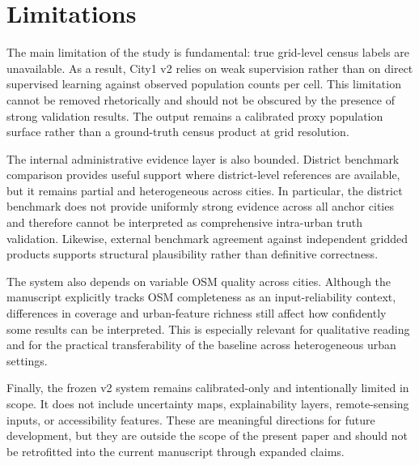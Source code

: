\section{Limitations}

The main limitation of the study is fundamental: true grid-level census labels are unavailable. As a result, City1 v2 relies on weak supervision rather than on direct supervised learning against observed population counts per cell. This limitation cannot be removed rhetorically and should not be obscured by the presence of strong validation results. The output remains a calibrated proxy population surface rather than a ground-truth census product at grid resolution.

The internal administrative evidence layer is also bounded. District benchmark comparison provides useful support where district-level references are available, but it remains partial and heterogeneous across cities. In particular, the district benchmark does not provide uniformly strong evidence across all anchor cities and therefore cannot be interpreted as comprehensive intra-urban truth validation. Likewise, external benchmark agreement against independent gridded products supports structural plausibility rather than definitive correctness.

The system also depends on variable OSM quality across cities. Although the manuscript explicitly tracks OSM completeness as an input-reliability context, differences in coverage and urban-feature richness still affect how confidently some results can be interpreted. This is especially relevant for qualitative reading and for the practical transferability of the baseline across heterogeneous urban settings.

Finally, the frozen v2 system remains calibrated-only and intentionally limited in scope. It does not include uncertainty maps, explainability layers, remote-sensing inputs, or accessibility features. These are meaningful directions for future development, but they are outside the scope of the present paper and should not be retrofitted into the current manuscript through expanded claims.
